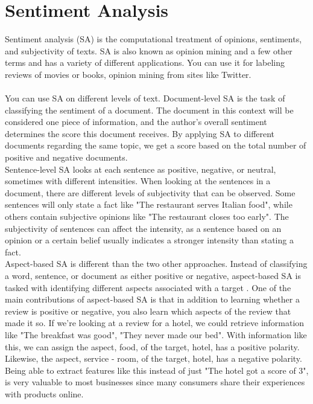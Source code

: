 \section{Sentiment Analysis}
Sentiment analysis (SA) is the computational treatment of opinions, sentiments, and subjectivity of texts. SA is also known as opinion mining and a few other terms and has a variety of different applications. You can use it for labeling reviews of movies or books, opinion mining from sites like Twitter.\\\\
You can use SA on different levels of text. Document-level SA is the task of classifying the sentiment of a document. The document in this context will be considered one piece of information, and the author's overall sentiment determines the score this document receives. By applying SA to different documents regarding the same topic, we get a score based on the total number of positive and negative documents.\\
Sentence-level SA looks at each sentence as positive, negative, or neutral, sometimes with different intensities. When looking at the sentences in a document, there are different levels of subjectivity that can be observed. Some sentences will only state a fact like "The restaurant serves Italian food", while others contain subjective opinions like "The restaurant closes too early". The subjectivity of sentences can affect the intensity, as a sentence based on an opinion or a certain belief usually indicates a stronger intensity than stating a fact.\\%
Aspect-based SA is different than the two other approaches. Instead of classifying a word, sentence, or document as either positive or negative, aspect-based SA is tasked with identifying different aspects associated with a target \cite{pontiki-etal-2016-semeval}. One of the main contributions of aspect-based SA is that in addition to learning whether a review is positive or negative, you also learn which aspects of the review that made it so. If we're looking at a review for a hotel, we could retrieve information like "The breakfast was good", "They never made our bed". With information like this, we can assign the aspect, food, of the target, hotel, has a positive polarity. Likewise, the aspect, service - room, of the target, hotel, has a negative polarity. Being able to extract features like this instead of just "The hotel got a score of 3", is very valuable to most businesses since many consumers share their experiences with products online.\\\\
